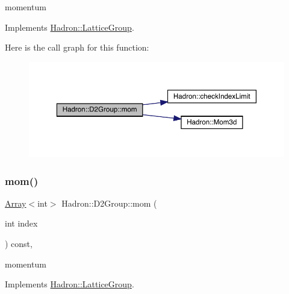 momentum 

Implements \mbox{\hyperlink{structHadron_1_1LatticeGroup_ad577b65041dd9a6e84b1f3bd49cb8fce}{Hadron\+::\+Lattice\+Group}}.

Here is the call graph for this function\+:
\nopagebreak
\begin{figure}[H]
\begin{center}
\leavevmode
\includegraphics[width=350pt]{d8/de7/structHadron_1_1D2Group_a65d28ef1fef635e870d60b6606b65f19_cgraph}
\end{center}
\end{figure}
\mbox{\label{structHadron_1_1D2Group_a65d28ef1fef635e870d60b6606b65f19}} 
\subsubsection{\texorpdfstring{mom()}{mom()}\hspace{0.1cm}{\footnotesize\ttfamily [3/3]}}
{\footnotesize\ttfamily \mbox{\hyperlink{classXMLArray_1_1Array}{Array}}$<$int$>$ Hadron\+::\+D2\+Group\+::mom (\begin{DoxyParamCaption}\item[{int}]{index }\end{DoxyParamCaption}) const\hspace{0.3cm}{\ttfamily [inline]}, {\ttfamily [virtual]}}

momentum 

Implements \mbox{\hyperlink{structHadron_1_1LatticeGroup_ad577b65041dd9a6e84b1f3bd49cb8fce}{Hadron\+::\+Lattice\+Group}}.

